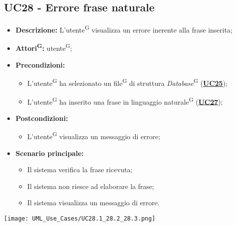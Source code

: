 \subsection{UC28 - Errore frase naturale}
\label{sec:UC28}
\begin{itemize}
	\item \textbf{Descrizione:} L’utente\textsuperscript{G} visualizza un errore inerente alla frase inserita;
	\item \textbf{Attori\textsuperscript{G}:} utente\textsuperscript{G};
	\item \textbf{Precondizioni:} 
	\begin{itemize}
		\item L’utente\textsuperscript{G} ha selezionato un file\textsuperscript{G} di struttura \textit{Database}\textsuperscript{G} (\hyperref[sec:UC25]{\textbf{UC25}});
		\item L'utente\textsuperscript{G} ha inserito una frase in linguaggio naturale\textsuperscript{G} (\hyperref[sec:UC27]{\textbf{UC27}});
	\end{itemize}
	\item \textbf{Postcondizioni:} 
	\begin{itemize}
		\item L’utente\textsuperscript{G} visualizza un messaggio di errore;
	\end{itemize}
	\item \textbf{Scenario principale:} 
	\begin{itemize}
		\item Il sistema verifica la frase ricevuta;
		\item Il sistema non riesce ad elaborare la frase;
		\item Il sistema visualizza un messaggio di errore.
	\end{itemize}
\end{itemize}

\texttt{[image: UML\_Use\_Cases/UC28.1\_28.2\_28.3.png]}

